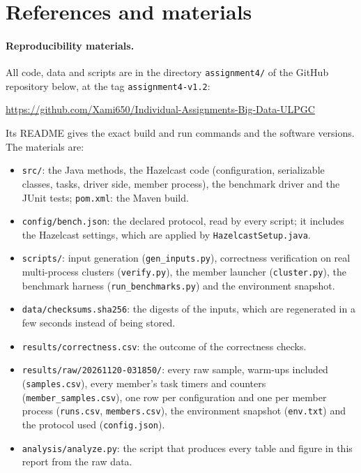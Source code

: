 \documentclass[11pt,a4paper]{article}
\newcommand{\repourl}{\url{https://github.com/Xami650/Individual-Assignments-Big-Data-ULPGC}}
\newcommand{\session}{\texttt{20261120-031850}}
\begin{document}
\section{References and materials}
\label{sec:materials}

\paragraph{Reproducibility materials.} All code, data and scripts are in the
directory \texttt{assignment4/} of the GitHub repository below, at the tag
\texttt{assignment4-v1.2}:
\begin{center}\repourl\end{center}
Its README gives the exact build and run commands and the software versions.
The materials are:
\begin{itemize}
  \item \texttt{src/}: the Java methods, the Hazelcast code (configuration,
  serializable classes, tasks, driver side, member process), the benchmark
  driver and the JUnit tests; \texttt{pom.xml}: the Maven build.
  \item \texttt{config/bench.json}: the declared protocol, read by every script;
  it includes the Hazelcast settings, which are applied by
  \texttt{HazelcastSetup.java}.
  \item \texttt{scripts/}: input generation (\texttt{gen\_inputs.py}),
  correctness verification on real multi-process clusters (\texttt{verify.py}),
  the member launcher (\texttt{cluster.py}), the benchmark harness
  (\texttt{run\_benchmarks.py}) and the environment snapshot.
  \item \texttt{data/checksums.sha256}: the digests of the inputs, which are
  regenerated in a few seconds instead of being stored.
  \item \texttt{results/correctness.csv}: the outcome of the correctness checks.
  \item \texttt{results/raw/\session/}: every raw sample, warm-ups included
  (\texttt{samples.csv}), every member's task timers and counters
  (\texttt{member\_samples.csv}), one row per configuration and one per member
  process (\texttt{runs.csv}, \texttt{members.csv}), the environment snapshot
  (\texttt{env.txt}) and the protocol used (\texttt{config.json}).
  \item \texttt{analysis/analyze.py}: the script that produces every table and
  figure in this report from the raw data.
\end{itemize}
\end{document}
